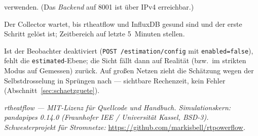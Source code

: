 \documentclass[11pt,a4paper,parskip=half]{scrreprt}
\newcommand{\api}[1]{\texttt{#1}}
\begin{document}
\begin{description}
    verwenden. (Das \emph{Backend} auf 8001 ist über IPv4 erreichbar.)
  \item[Grafana zeigt nichts] Der Collector wartet, bis rtheatflow und InfluxDB
    gesund sind und der erste Schritt gelöst ist; Zeitbereich auf \glqq letzte
    5~Minuten\grqq{} stellen.
  \item[Die Schätzung erscheint nicht oder springt] Ist der Beobachter
    deaktiviert (\api{POST /estimation/config} mit \texttt{enabled=false}), fehlt
    die \texttt{estimated}-Ebene; die Sicht fällt dann auf Realität (bzw.\ im
    strikten Modus auf Gemessen) zurück. Auf großen Netzen zieht die Schätzung
    wegen der Selbstdrosselung in Sprüngen nach --- sichtbare Rechenzeit, kein
    Fehler (Abschnitt~\ref{sec:schaetzguete}).
\end{description}

\vfill
\begin{center}\small
\textit{rtheatflow --- MIT-Lizenz für Quellcode und Handbuch. Simulationskern:
pandapipes 0.14.0 (Fraunhofer IEE / Universität Kassel, BSD-3).
Schwesterprojekt für Stromnetze:} \url{https://github.com/markisbell/rtpowerflow}\textit{.}
\end{center}
\end{document}
